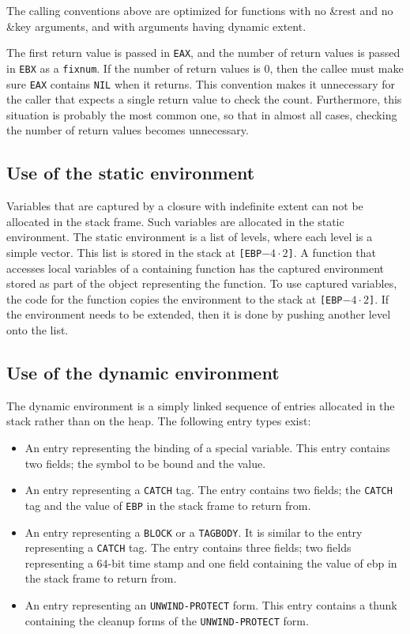 The calling conventions above are optimized for functions with no
\&rest and no \&key arguments, and with arguments having dynamic
extent.

The first return value is passed in \texttt{EAX}, and the number of
return values is passed in \texttt{EBX} as a \texttt{fixnum}.  If the
number of return values is $0$, then the callee must make sure
\texttt{EAX} contains \texttt{NIL} when it returns.  This convention
makes it unnecessary for the caller that expects a single return value
to check the count.  Furthermore, this situation is probably the most
common one, so that in almost all cases, checking the number of return
values becomes unnecessary. 

\subsection{Use of the static environment}

Variables that are captured by a closure with indefinite extent can
not be allocated in the stack frame.  Such variables are allocated in
the static environment.  The static environment is a list of levels,
where each level is a simple vector.  This list is stored in the stack
at \texttt{[EBP$-4 \cdot 2$]}.  A function that accesses local
variables of a containing function has the captured environment stored
as part of the object representing the function.  To use captured
variables, the code for the function copies the environment to the
stack at \texttt{[EBP$-4 \cdot 2$]}.  If the environment needs to be
extended, then it is done by pushing another level onto the list.

\subsection{Use of the dynamic environment}

The dynamic environment is a simply linked sequence of entries
allocated in the stack rather than on the heap.  The following entry
types exist:

\begin{itemize}
  \item An entry representing the binding of a special variable.  This
    entry contains two fields; the symbol to be bound and the value.

  \item An entry representing a \texttt{CATCH} tag.  The entry
    contains two fields; the \texttt{CATCH} tag and the value of
    \texttt{EBP} in the stack frame to return from.

  \item An entry representing a \texttt{BLOCK} or a \texttt{TAGBODY}.
    It is similar to the entry representing a \texttt{CATCH} tag.  The
    entry contains three fields; two fields representing a 64-bit time
    stamp and one field containing the value of ebp in the stack frame
    to return from.

  \item An entry representing an \texttt{UNWIND-PROTECT} form.  This
    entry contains a thunk containing the cleanup forms of the
    \texttt{UNWIND-PROTECT} form.
\end{itemize}

